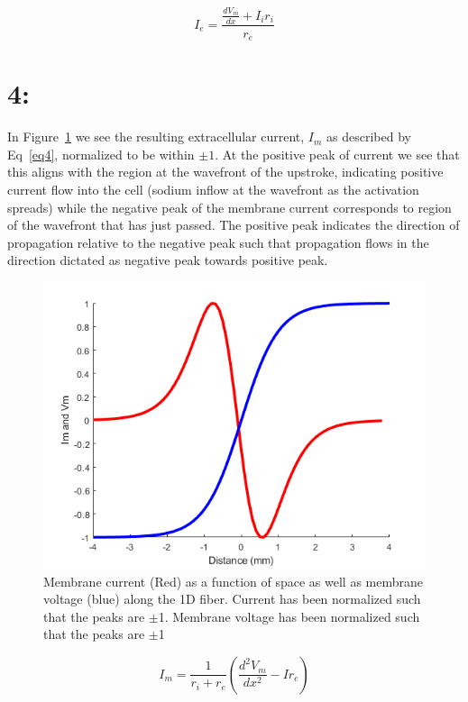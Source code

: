 \documentclass[12pt]{article}
\begin{document}
\begin{equation}
I_e = \frac{\frac{dV_m}{dx} + I_ir_i}{r_e}
\label{eq3}
\end{equation}

\section{4: }
In Figure~\ref{Fig:Im} we see the resulting extracellular current, $I_m$ as described by Eq~\ref{eq4}, normalized to be within $\pm 1$. At the positive peak of current we see that this aligns with the region at the wavefront of the upstroke, indicating positive current flow into the cell (sodium inflow at the wavefront as the activation spreads) while the negative peak of the membrane current corresponds to region of the wavefront that has just passed. The positive peak indicates the direction of propagation  relative to the negative peak such that propagation flows in the direction dictated as negative peak towards positive peak.
\begin{figure}[H]
	
	\centering
	\includegraphics[width=.95\textwidth]{Figures/Im.png}
	
	\caption{Membrane current (Red) as a function of space as well as membrane voltage (blue) along the 1D fiber. Current has been normalized such that the peaks are $\pm$1. Membrane voltage has been normalized such that the peaks are $\pm$1}
	\label{Fig:Im}
\end{figure}
\begin{equation}
I_m = \frac{1}{r_i + r_e}(\frac{d^2V_m}{dx^2} - Ir_e)
\label{eq4}
\end{equation}
\end{document}
